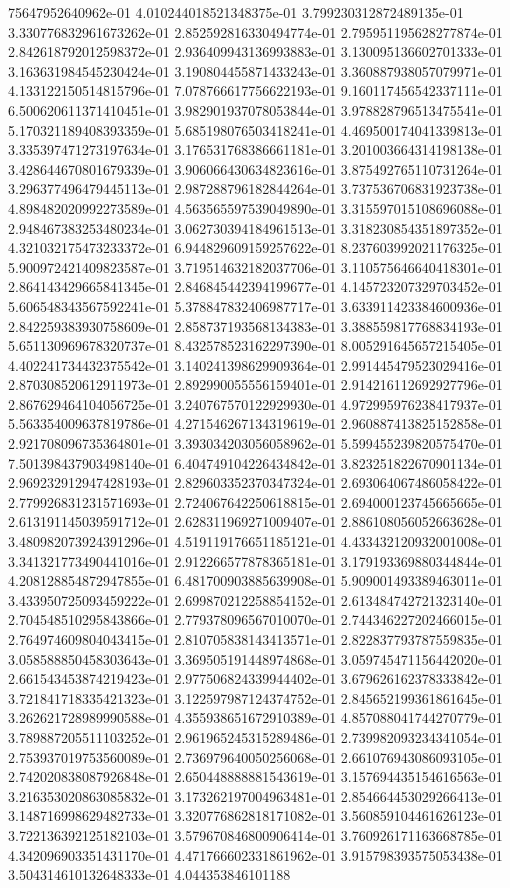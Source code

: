 75647952640962e-01	4.010244018521348375e-01	3.799230312872489135e-01	3.330776832961673262e-01	2.852592816330494774e-01	2.795951195628277874e-01	2.842618792012598372e-01	2.936409943136993883e-01	3.130095136602701333e-01	3.163631984545230424e-01	3.190804455871433243e-01	3.360887938057079971e-01	4.133122150514815796e-01	7.078766617756622193e-01	9.160117456542337111e-01	6.500620611371410451e-01	3.982901937078053844e-01	3.978828796513475541e-01	5.170321189408393359e-01	5.685198076503418241e-01	4.469500174041339813e-01	3.335397471273197634e-01	3.176531768386661181e-01	3.201003664314198138e-01	3.428644670801679339e-01	3.906066430634823616e-01	3.875492765110731264e-01	3.296377496479445113e-01	2.987288796182844264e-01	3.737536706831923738e-01	4.898482020992273589e-01	4.563565597539049890e-01	3.315597015108696088e-01	2.948467383253480234e-01	3.062730394184961513e-01	3.318230854351897352e-01	4.321032175473233372e-01	6.944829609159257622e-01	8.237603992021176325e-01	5.900972421409823587e-01	3.719514632182037706e-01	3.110575646640418301e-01	2.864143429665841345e-01	2.846845442394199677e-01	4.145723207329703452e-01	5.606548343567592241e-01	5.378847832406987717e-01	3.633911423384600936e-01	2.842259383930758609e-01	2.858737193568134383e-01	3.388559817768834193e-01	5.651130969678320737e-01	8.432578523162297390e-01	8.005291645657215405e-01	4.402241734432375542e-01	3.140241398629909364e-01	2.991445479523029416e-01	2.870308520612911973e-01	2.892990055556159401e-01	2.914216112692927796e-01	2.867629464104056725e-01	3.240767570122929930e-01	4.972995976238417937e-01	5.563354009637819786e-01	4.271546267134319619e-01	2.960887413825152858e-01	2.921708096735364801e-01	3.393034203056058962e-01	5.599455239820575470e-01	7.501398437903498140e-01	6.404749104226434842e-01	3.823251822670901134e-01	2.969232912947428193e-01	2.829603352370347324e-01	2.693064067486058422e-01	2.779926831231571693e-01	2.724067642250618815e-01	2.694000123745665665e-01	2.613191145039591712e-01	2.628311969271009407e-01	2.886108056052663628e-01	3.480982073924391296e-01	4.519119176651185121e-01	4.433432120932001008e-01	3.341321773490441016e-01	2.912266577878365181e-01	3.179193369880344844e-01	4.208128854872947855e-01	6.481700903885639908e-01	5.909001493389463011e-01	3.433950725093459222e-01	2.699870212258854152e-01	2.613484742721323140e-01	2.704548510295843866e-01	2.779378096567010070e-01	2.744346227202466015e-01	2.764974609804043415e-01	2.810705838143413571e-01	2.822837793787559835e-01	3.058588850458303643e-01	3.369505191448974868e-01	3.059745471156442020e-01	2.661543453874219423e-01	2.977506824339944402e-01	3.679626162378333842e-01	3.721841718335421323e-01	3.122597987124374752e-01	2.845652199361861645e-01	3.262621728989990588e-01	4.355938651672910389e-01	4.857088041744270779e-01	3.789887205511103252e-01	2.961965245315289486e-01	2.739982093234341054e-01	2.753937019753560089e-01	2.736979640050256068e-01	2.661076943086093105e-01	2.742020838087926848e-01	2.650448888881543619e-01	3.157694435154616563e-01	3.216353020863085832e-01	3.173262197004963481e-01	2.854664453029266413e-01	3.148716998629482733e-01	3.320776862818171082e-01	3.560859104461626123e-01	3.722136392125182103e-01	3.579670846800906414e-01	3.760926171163668785e-01	4.342096903351431170e-01	4.471766602331861962e-01	3.915798393575053438e-01	3.504314610132648333e-01	4.044353846101188